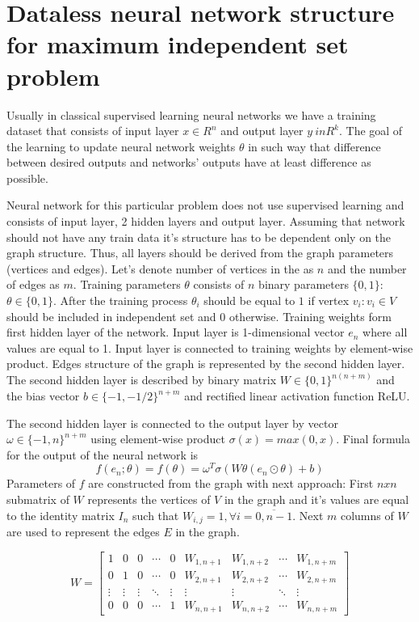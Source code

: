 \chapter{Dataless neural network structure for maximum independent set problem}

Usually in classical supervised learning neural networks we have a training dataset that consists of input layer $x \in R^n$ and output layer $y \ in R^k$. The goal of the learning to update neural network weights $\theta$ in such way that difference between desired outputs and networks' outputs have at least difference as possible.  

Neural network for this particular problem does not use supervised learning and consists of input layer, 2 hidden layers and output layer. Assuming that network should not have any train data it's structure has to be dependent only on the graph structure. Thus, all layers should be derived from the graph parameters (vertices and edges). Let's denote number of vertices in the \graphG as $n$ and the number of edges as $m$. Training parameters $\theta$ consists of $n$ binary parameters $\{0,1\}$: $\theta \in \{0,1\}$. After the training process $\theta_i$ should be equal to $1$ if vertex $v_i:v_i \in V$ should be included in independent set and $0$ otherwise. Training weights form first hidden layer of the network. Input layer is 1-dimensional vector $e_n$ where all values are equal to 1. Input layer is connected to training weights by element-wise product. Edges structure of the graph is represented by the second hidden layer. The second hidden layer is described by binary matrix $W \in \{0,1\}^{n(n+m)}$ and the bias vector $b \in \{-1,-1/2\}^{n+m}$ and rectified linear activation function ReLU. 

The second hidden layer is connected to the output  layer by vector $\omega \in \{-1,n\}^{n+m}$ using element-wise product $\sigma (x) = max(0,x)$. Final formula for the output of the neural network is 
\begin{equation}
    f(e_n;\theta) = f(\theta) = \omega^T \sigma(W\theta(e_n \odot \theta)+b)
\end{equation}
Parameters of $f$ are constructed from the graph \graphG with next approach:
First $n x n$ submatrix of $W$ represents the vertices of $V$ in the graph and it's values are equal to the identity matrix $I_n$ such that $W_{i,j} = 1, \forall i = \overline{0, n-1}$. Next $m$ columns of $W$ are used to represent the edges $E$ in the graph. 

\begin{equation} 
W =
\begin{bmatrix} 
1 & 0 & 0 & \cdots & 0 & W_{1,n+1} & W_{1,n+2} & \cdots & W_{1, n+m} \\ 
0 & 1 & 0  & \cdots & 0 & W_{2,n+1} & W_{2,n+2} & \cdots & W_{2, n+m} \\ 
\vdots & \vdots & \vdots & \ddots & \vdots & \vdots & \vdots & \ddots & \vdots \\
0 & 0 & 0 & \cdots & 1 & W_{n, n+1} & W_{n, n+2} & \cdots & W_{n, n+m}
\end{bmatrix}
\end{equation}

